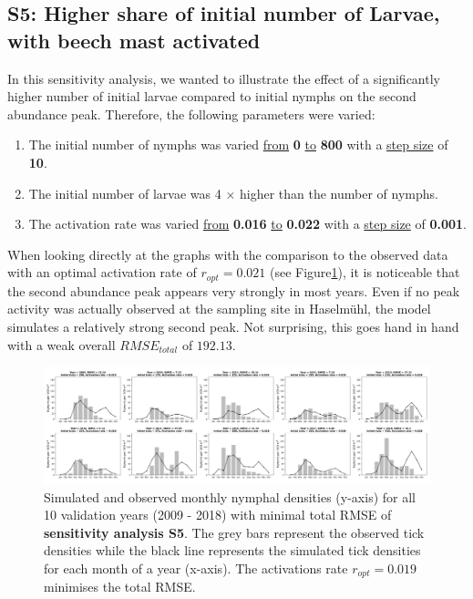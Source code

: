 \documentclass[a4paper, 11pt]{scrartcl}
\begin{document}
\subsection{S5: Higher share of initial number of Larvae, with beech mast activated}
In this sensitivity analysis, we wanted to illustrate the effect of a significantly higher number of initial larvae compared to initial nymphs on the second abundance peak.
Therefore, the following parameters were varied:

\begin{enumerate}
\item The initial number of nymphs was varied \underline{from} \textbf{0} \underline{to} \textbf{800} with a \underline{step size} of \textbf{10}.
\item The initial number of larvae was 4 $\times$ higher than the number of nymphs.
\item The activation rate was varied \underline{from} \textbf{0.016} \underline{to} \textbf{0.022} with a \underline{step size} of \textbf{0.001}.
\end{enumerate}

When looking directly at the graphs with the comparison to the observed data with an optimal activation rate of $r_{opt}= 0.021$ (see Figure\ref{fig:1nymphs_4larvae}), it is
noticeable that the second abundance peak appears very strongly in most years. Even if no peak activity was actually observed at the sampling site in Haselmühl, the model
simulates a relatively strong second peak. Not surprising, this goes hand in hand with a weak overall $RMSE_{total}$ of $192.13$.

\begin{figure}[h!]
\centering
\includegraphics[width=\linewidth]{figures/1nymphs_4larvae_with_beech}
\caption{Simulated and observed monthly nymphal densities (y-axis) for all 10 validation years (2009 - 2018) with minimal total RMSE of \textbf{sensitivity analysis S5}. The
grey bars represent the observed tick densities while the black line represents the simulated tick densities for each month of a year (x-axis). The activations rate
$r_{opt}= 0.019$ minimises the total RMSE.}
\label{fig:1nymphs_4larvae}
\end{figure}
\end{document}
